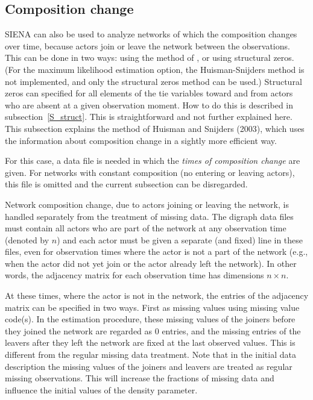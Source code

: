 \documentclass[a4paper,fleqn]{article}
\newcommand{\+}{\, + \,}
\newcommand{\SI}{{\sf SIENA }}
\begin{document}
{\subsection{Composition change}
\label{S_comp}

\SI can also be used to analyze networks of which the composition
changes over time, because actors join or leave the network
between the observations.
This can be done in two ways: using the method of \citet{HuismanSnijders03},
or using structural zeros.
(For the maximum likelihood estimation option, the Huisman-Snijders method
is not implemented, and only the structural zeros method can be used.)
Structural zeros can specified for all elements of the tie variables
toward and from actors who are absent at a given observation moment.
How to do this is described in subsection~\ref{S_struct}.
This is straightforward and not further explained here.
This subsection explains the method of Huisman and Snijders
(2003), which uses the information about composition change
in a sightly more efficient way.

For this case, a data file is needed in which the
\emph{times of composition change} are given. For networks with
constant composition (no entering or leaving actors), this file is
omitted and the current subsection can be disregarded.

Network composition change, due to actors joining or leaving the
network, is handled separately from the treatment of missing data.
The digraph data files must contain all actors who are part of the
network at any observation time (denoted by $n$) and each actor
must be given a separate (and fixed) line in these files, even for
observation times where the actor is not a part of the network
(e.g., when the actor did not yet join or the actor already left
the network). In other words, the adjacency matrix for each
observation time has dimensions $n \times n$.

\begin{screen}
\newpage
\end{screen}
At these times, where the actor is not in the network, the entries
of the adjacency matrix can be specified in two ways. First as
missing values using missing value code(s). In the estimation
procedure, these missing values of the joiners before they joined
the network are regarded as 0 entries, and the missing entries of
the leavers after they left the network are fixed at the last
observed values. This is different from the regular missing data
treatment. Note that in the initial data description the missing
values of the joiners and leavers are treated as regular missing
observations. This will increase the fractions of missing data and
influence the initial values of the density parameter.

}
\end{document}
